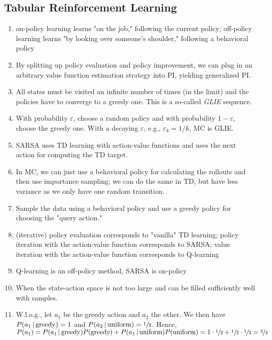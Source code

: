 		\subsection{Tabular Reinforcement Learning}
			\begin{enumerate}
				\item on-policy learning learns "on the job," following the current policy; off-policy learning learns "by looking over someone's shoulder," following a behavioral policy
				\item By splitting up policy evaluation and policy improvement, we can plug in an arbitrary value function estimation strategy into \ac{PI}, yielding generalized \ac{PI}.
				\item All states must be visited an infinite number of times (in the limit) and the policies have to converge to a greedy one. This is a so-called \emph{\ac{GLIE}} sequence.
				\item With probability \(\varepsilon\), choose a random policy and with probability \(1 - \varepsilon\), choose the greedy one. With a decaying \(\varepsilon\), e.g., \( \varepsilon_k = 1/k \), \ac{MC} is \ac{GLIE}.
				\item \ac{SARSA} uses \ac{TD} learning with action-value functions and uses the next action for computing the \ac{TD} target.
				\item In \ac{MC}, we can just use a behavioral policy for calculating the rollouts and then use importance sampling; we can do the same in \ac{TD}, but have less variance as we only have one random transition.
				\item Sample the data using a behavioral policy and use a greedy policy for choosing the "query action."
				\item (iterative) policy evaluation corresponds to "vanilla" \ac{TD} learning; policy iteration with the action-value function corresponds to \ac{SARSA}; value iteration with the action-value function corresponds to Q-learning
				\item Q-learning is an off-policy method, \ac{SARSA} is on-policy
				\item When the state-action space is not too large and can be filled sufficiently well with samples.
				\item W.l.o.g., let \(a_1\) be the greedy action and \(a_2\) the other. We then have \( P(a_1 \,\vert\, \text{greedy}) = 1 \) and \( P(a_2 \given \text{uniform}) = \sfrac{1}{2} \). Hence, \( P(a_1) = P(a_1 \given \text{greedy}) P(\text{greedy}) + P(a_1 \given \text{uniform}) P(\text{uniform}) = 1 \cdot \sfrac{1}{2} + \sfrac{1}{2} \cdot \sfrac{1}{2} = \sfrac{3}{4} \)
			\end{enumerate}

